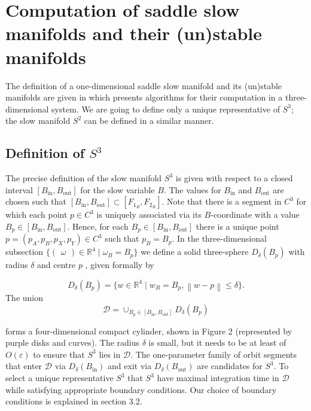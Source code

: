 \documentclass{ws-ijbc}
\begin{document}
 \section{Computation of saddle slow manifolds and their (un)stable manifolds}
    
The definition of a one-dimensional saddle slow manifold and its (un)stable manifolds are given in \cite{Saeed_Paper} which presents algorithms for their computation in a three-dimensional system.  We are going to define only a unique representative of $S^3$; the slow manifold $S^2$ can be defined in a similar manner.

\subsection{Definition of $S^3$}    
The precise definition of the slow manifold $S^3$ is given with respect to a closed interval $[B_{\mathrm{in}},B_{\mathrm{out}}]$ for the slow variable $B$.  The values for $B_{\mathrm{in}}$ and $B_{\mathrm{out}}$ are chosen such that $[B_{\mathrm{in}},B_{\mathrm{out}}] \subset [F_{1_B}, F_{2_B}]$.  Note that there is a segment in $C^3$ for which each point $p \in C^3$ is uniquely associated via its $B$-coordinate with a value $B_p \in [B_{\mathrm{in}},B_{\mathrm{out}}]$.  Hence, for each $B_p \in [B_{\mathrm{in}},B_{\mathrm{out}}]$ there is a unique point $p=(p_A,p_B,p_X,p_Y) \in C^3$ such that $p_B = B_p$.  In the three-dimensional subsection $\{ \begin{pmatrix} \omega \end{pmatrix} \in \mathbb{R}^4 \; | \; \omega_B=B_p\}$ we define a solid three-sphere $D_\delta(B_p)$ with radius $\delta$ and centre $p$ , given formally by

\begin{equation*}
D_\delta(B_p)=\{w \in \mathbb{R}^4 \; | \; w_B = B_p, \left\lVert w-p \right\rVert \leq \delta\}.
\end{equation*}    
\noindent
The union 
\begin{equation*}
\mathscr{D} = \cup_{B_p \in [B_{\mathrm{in}}, B_{\mathrm{out}}]} D_\delta(B_p) 
\end{equation*}


\noindent
forms a four-dimensional compact cylinder, shown in Figure 2 (represented by purple disks and curves).  The radius $\delta$ is small, but it needs to be at least of $O(\varepsilon)$ to ensure that $S^3$ lies in $\mathscr{D}$.  The one-parameter family of orbit segments that enter $\mathscr{D}$ via $D_\delta(B_{\mathrm{in}})$ and exit via $D_\delta(B_{\mathrm{out}})$ are candidates for $S^3$.   To select a unique representative $S^3$ that $S^3$ have maximal integration time in $\mathscr{D}$ while satisfying appropriate boundary conditions.  Our choice of boundary conditions is explained in section 3.2.
    
\end{document}
